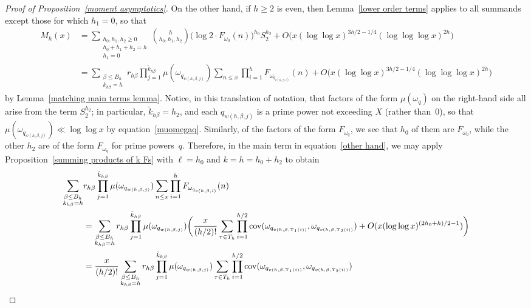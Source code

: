 \documentclass[12pt,reqno]{amsart}
\theoremstyle{definition}
\newcommand{\cov}{\mathop{\rm cov}\nolimits}
\begin{document}
\begin{proof}[Proof of Proposition~\ref{moment asymptotics}]
On the other hand, if $h\ge2$ is even, then Lemma~\ref{lower order terms} applies to all summands except those for which $h_1=0$, so that
\begin{equation} \label{other hand}
\begin{split}
M_h(x) &= \sum_{\substack{h_0,h_1,h_2\ge0 \\ h_0+h_1+h_2=h \\ h_1=0}} \binom h{h_0,h_1,h_2} \big( \log 2 \cdot F_{\omega_0}(n) \big)^{h_0} S_2^{h_2} +O \big( x(\log\log x)^{3h/2 - 1/4}(\log\log\log x)^{2h} \big) \\
&= \sum_{\substack{\beta\le B_h \\ k_{h\beta}=h}} r_{h\beta} \prod_{j=1}^{\tilde k_{h\beta}} \mu(\omega_{q_{w(h,\beta, j)}}) \sum_{n \leq x} \prod_{i=1}^h F_{\omega_{q_{v(h,\beta, i)}}}(n) +O \big( x(\log\log x)^{3h/2 - 1/4}(\log\log\log x)^{2h} \big)
\end{split}
\end{equation}
by Lemma~\ref{matching main terms lemma}. Notice, in this translation of notation, that factors of the form $\mu(\omega_q)$ on the right-hand side all arise from the term $S_2^{h_2}$; in particular, $\tilde k_{h\beta} = h_2$, and each ${q_{w(h,\beta, j)}}$ is a prime power not exceeding $X$ (rather than~$0$), so that $\mu(\omega_{q_{w(h,\beta, j)}}) \ll \log\log x$ by equation~\eqref{muomegaq}. Similarly, of the factors of the form $F_{\omega_q}$, we see that $h_0$ of them are $F_{\omega_0}$, while the other $h_2$ are of the form $F_{\omega_q}$ for prime powers~$q$.
Therefore, in the main term in equation~\eqref{other hand}, we may apply Proposition~\ref{summing products of k Fs} with $\ell=h_0$ and $k=h=h_0+h_2$ to obtain
\begin{align}
\sum_{\substack{\beta\le B_h \\ k_{h\beta}=h}} & r_{h\beta} \prod_{j=1}^{\tilde k_{h\beta}} \mu(\omega_{q_{w(h,\beta, j)}}) \sum_{n \leq x} \prod_{i=1}^h F_{\omega_{q_{v(h,\beta, i)}}}(n) \notag \\
&= \sum_{\substack{\beta\le B_h \\ k_{h\beta}=h}} r_{h\beta} \prod_{j=1}^{\tilde k_{h\beta}} \mu(\omega_{q_{w(h,\beta, j)}}) \bigg( \frac x{(h/2)!} \sum_{\tau\in T_h} \prod_{i=1}^{h/2} \cov(\omega_{q_{v(h,\beta,\Upsilon_1(i))}},\omega_{q_{v(h,\beta,\Upsilon_2(i))}}) + O( x(\log\log x)^{(2h_0+h)/2 - 1} ) \bigg) \notag \\
&= \frac x{(h/2)!} \sum_{\substack{\beta\le B_h \\ k_{h\beta}=h}} r_{h\beta} \prod_{j=1}^{\tilde k_{h\beta}} \mu(\omega_{q_{w(h,\beta, j)}}) \sum_{\tau\in T_h} \prod_{i=1}^{h/2} \cov(\omega_{q_{v(h,\beta,\Upsilon_1(i))}},\omega_{q_{v(h,\beta,\Upsilon_2(i))}}) \notag \\

\end{align}
\end{proof}
\end{document}
